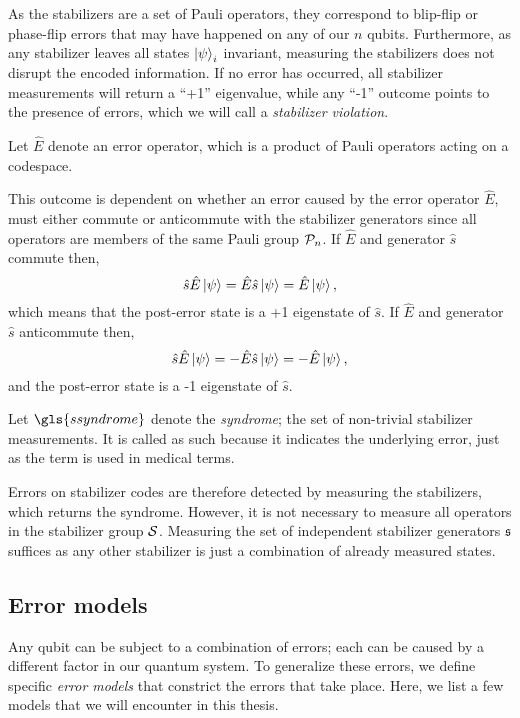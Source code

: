 As the stabilizers are a set of Pauli operators, they correspond to blip-flip or phase-flip errors that may have happened on any of our $n$ qubits. Furthermore, as any stabilizer leaves all states  $\ket{\psi}_i$ invariant, measuring the stabilizers does not disrupt the encoded information. If no error has occurred, all stabilizer measurements will return a ``+1'' eigenvalue, while any ``-1'' outcome points to the presence of errors, which we will call a \emph{stabilizer violation}.
\begin{definition}
  Let $\hat{E}$ denote an error operator, which is a product of Pauli operators acting on a codespace. 
\end{definition}
This outcome is dependent on whether an error caused by the error operator $\hat{E}$, must either commute or anticommute with the stabilizer generators since all operators are members of the same Pauli group $\mathcal{P}_n$. If $\hat{E}$ and generator $\hat{s}$ commute then,
\begin{equation}
  \hat{s}\hat{E}\ket{\psi} = \hat{E}\hat{s}\ket{\psi} = \hat{E}\ket{\psi},
\end{equation}
which means that the post-error state is a +1 eigenstate of $\hat{s}$. If $\hat{E}$ and generator $\hat{s}$ anticommute then,
\begin{equation}\label{qec:eq:stabmeas}
  \hat{s}\hat{E}\ket{\psi} = -\hat{E}\hat{s}\ket{\psi} = -\hat{E}\ket{\psi},
\end{equation}
and the post-error state is a -1 eigenstate of $\hat{s}$. 
\begin{definition}\label{def:syndrome}
  Let $\gls{ssyndrome}$ denote the \emph{syndrome}; the set of non-trivial stabilizer measurements. It is called as such because it indicates the underlying error, just as the term is used in medical terms. 
\end{definition}
Errors on stabilizer codes are therefore detected by measuring the stabilizers, which returns the syndrome. However, it is not necessary to measure all operators in the stabilizer group $\mathcal{S}$. Measuring the set of independent stabilizer generators $\mathfrak{s}$ suffices as any other stabilizer is just a combination of already measured states.

\subsection{Error models}\label{qec:sec_errormodels}
Any qubit can be subject to a combination of errors; each can be caused by a different factor in our quantum system. To generalize these errors, we define specific \emph{error models} that constrict the errors that take place. Here, we list a few models that we will encounter in this thesis. 

